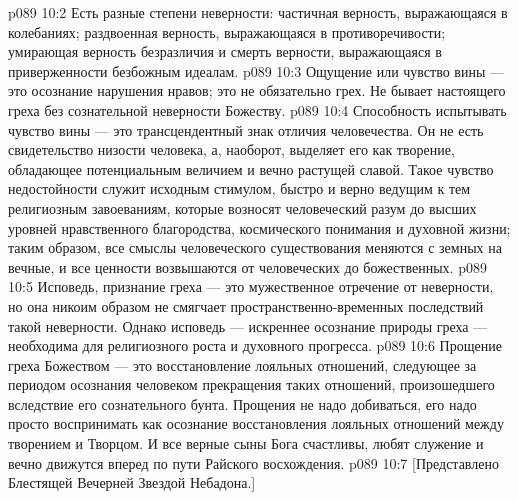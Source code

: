 \vs p089 10:2 \pc {} Есть разные степени неверности: частичная верность, выражающаяся в колебаниях; раздвоенная верность, выражающаяся в противоречивости; умирающая верность безразличия и смерть верности, выражающаяся в приверженности безбожным идеалам.
\vs p089 10:3 \pc Ощущение или чувство вины --- это осознание нарушения нравов; это не обязательно грех. Не бывает настоящего греха без сознательной неверности Божеству.
\vs p089 10:4 Способность испытывать чувство вины --- это трансцендентный знак отличия человечества. Он не есть свидетельство низости человека, а, наоборот, выделяет его как творение, обладающее потенциальным величием и вечно растущей славой. Такое чувство недостойности служит исходным стимулом, быстро и верно ведущим к тем религиозным завоеваниям, которые возносят человеческий разум до высших уровней нравственного благородства, космического понимания и духовной жизни; таким образом, все смыслы человеческого существования меняются с земных на вечные, и все ценности возвышаются от человеческих до божественных.
\vs p089 10:5 Исповедь, признание греха --- это мужественное отречение от неверности, но она никоим образом не смягчает пространственно\hyp{}временных последствий такой неверности. Однако исповедь --- искреннее осознание природы греха --- необходима для религиозного роста и духовного прогресса.
\vs p089 10:6 Прощение греха Божеством --- это восстановление лояльных отношений, следующее за периодом осознания человеком прекращения таких отношений, произошедшего вследствие его сознательного бунта. Прощения не надо добиваться, его надо просто воспринимать как осознание восстановления лояльных отношений между творением и Творцом. И все верные сыны Бога счастливы, любят служение и вечно движутся вперед по пути Райского восхождения.
\vsetoff
\vs p089 10:7 [Представлено Блестящей Вечерней Звездой Небадона.]
